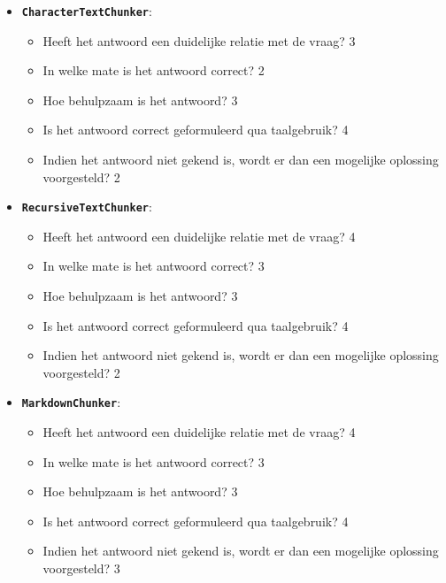 \begin{itemize}
    \item \texttt{\textbf{CharacterTextChunker}}:
    \begin{itemize}
        \item Heeft het antwoord een duidelijke relatie met de vraag? 3
        \item In welke mate is het antwoord correct? 2
        \item Hoe behulpzaam is het antwoord? 3
        \item Is het antwoord correct geformuleerd qua taalgebruik? 4
        \item Indien het antwoord niet gekend is, wordt er dan een mogelijke oplossing voorgesteld? 2
    \end{itemize}
    \item \texttt{\textbf{RecursiveTextChunker}}:
    \begin{itemize}
        \item Heeft het antwoord een duidelijke relatie met de vraag? 4
        \item In welke mate is het antwoord correct? 3
        \item Hoe behulpzaam is het antwoord? 3
        \item Is het antwoord correct geformuleerd qua taalgebruik? 4
        \item Indien het antwoord niet gekend is, wordt er dan een mogelijke oplossing voorgesteld? 2
    \end{itemize}
    \item \texttt{\textbf{MarkdownChunker}}:
    \begin{itemize}
        \item Heeft het antwoord een duidelijke relatie met de vraag? 4
        \item In welke mate is het antwoord correct? 3
        \item Hoe behulpzaam is het antwoord? 3
        \item Is het antwoord correct geformuleerd qua taalgebruik? 4
        \item Indien het antwoord niet gekend is, wordt er dan een mogelijke oplossing voorgesteld? 3
    \end{itemize}
\end{itemize}

